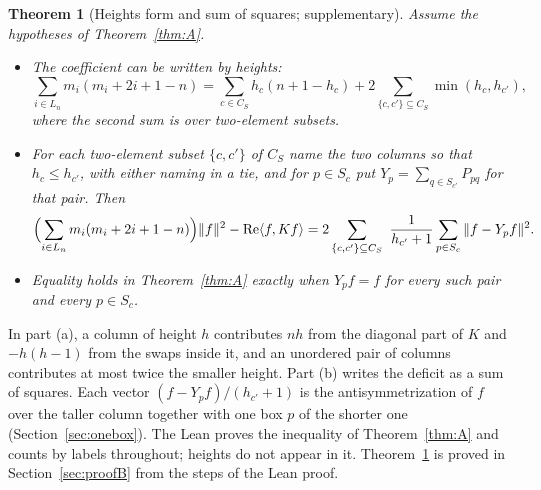 \documentclass[11pt]{amsart}
\newcommand{\notlean}{supplementary}
\newtheorem{maintheorem}{Theorem}
\theoremstyle{definition}
\theoremstyle{remark}
\begin{document}
\begin{maintheorem}[Heights form and sum of squares; \notlean]\label{thm:B}
Assume the hypotheses of Theorem~\ref{thm:A}.
\begin{itemize}
\item[(a)] The coefficient can be written by heights:
\[
\sum_{i\in L_n}m_i(m_i+2i+1-n)
=\sum_{c\in C_S}h_c(n+1-h_c)+2\sum_{\{c,c'\}\subseteq C_S}\min(h_c,h_{c'}),
\]
where the second sum is over two-element subsets.
\item[(b)] For each two-element subset \(\{c,c'\}\) of \(C_S\) name the two
columns so that \(h_c\le h_{c'}\), with either naming in a tie, and for
\(p\in S_c\) put \(Y_p=\sum_{q\in S_{c'}}P_{pq}\) for that pair. Then
\[
\Bigl(\sum_{i\in L_n}m_i(m_i+2i+1-n)\Bigr)\|f\|^2-\operatorname{Re}\langle f,Kf\rangle
=2\sum_{\{c,c'\}\subseteq C_S}\ \frac{1}{h_{c'}+1}\sum_{p\in S_c}\|f-Y_pf\|^2 .
\]
\item[(c)] Equality holds in Theorem~\ref{thm:A} exactly when \(Y_pf=f\) for
every such pair and every \(p\in S_c\).
\end{itemize}
\end{maintheorem}

In part (a), a column of height \(h\) contributes \(nh\) from the diagonal
part of \(K\) and \(-h(h-1)\) from the swaps inside it, and an unordered pair
of columns contributes at most twice the smaller height. Part (b) writes
the deficit as a sum of squares. Each vector \((f-Y_pf)/(h_{c'}+1)\) is the
antisymmetrization of \(f\) over the taller column together with one box
\(p\) of the shorter one (Section~\ref{sec:onebox}). The Lean proves the
inequality of Theorem~\ref{thm:A} and counts by labels throughout; heights
do not appear in it. Theorem~\ref{thm:B} is proved in
Section~\ref{sec:proofB} from the steps of the Lean proof.
\end{document}
